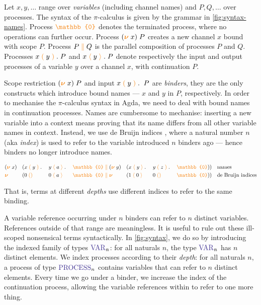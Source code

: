 \documentclass[a4paper,UKenglish,cleveref,autoref,thm-restate,authorcolumns]{lipics-v2019}
\theoremstyle{definition}
\newcommand{\picalc}{$\pi$-calculus}
\newcommand{\type}[1]{\textcolor{BlueViolet}{\operatorname{#1}}}
\newcommand{\constr}[1]{\textcolor{BurntOrange}{\operatorname{#1}}}
\newcommand{\PO}{\constr{\mathbb{0}}}
\newcommand{\comp}[2]{#1 \; \constr{\parallel} \; #2}
\newcommand{\new}{\constr{\boldsymbol{\nu}} \;}
\newcommand{\send}[2]{#1 \; \constr{\langle} \; #2 \;\constr{\rangle} \;}
\newcommand{\sendp}[2]{#1 \; \constr{\langle} \; #2 \; \constr{\rangle} \; . \;}
\newcommand{\recv}[1]{#1 \; \constr{\mathbb{()}} \;}
\newcommand{\recvp}[2]{#1 \; \constr{(} \; #2 \; \constr{)} \; . \; }
\newcommand{\Var}{\type{VAR}}
\newcommand{\Process}{\type{PROCESS}}
\begin{document}
Let $x, y,\ldots$ range over \emph{variables} (including channel names) and $P, Q,\ldots$ over processes.
The syntax of the \picalc{} \cite{Sangio01} is given by the grammar in \autoref{fig:syntax-names}.
Process $\PO$ denotes the terminated process, where no operations can further occur.
Process $(\new{}x)\; P$ creates a new channel $x$ bound with scope $P$.
Process $\comp{P}{Q}$ is the parallel composition of processes $P$ and $Q$.
Processes $\recvp{x}{y} P$ and $\sendp{x}{y} P$ denote respectively the input and output processes of a variable $y$ over a channel $x$, with continuation $P$.

Scope restriction $(\new{}x) \; P$ and input $\recvp{x}{y} \; P$ are \emph{binders}, they are the only constructs which introduce bound names --- $x$ and $y$ in $P$, respectively.
In order to mechanise the \picalc{} syntax in Agda, we need to deal with bound names in continuation processes.
Names are cumbersome to mechanise: inserting a new variable into a context means proving that its name differs from all other variable names in context.
Instead, we use de Bruijn indices \cite{deBruijn1972}, where a natural number $n$ (aka \emph{index}) is used to refer to the variable introduced $n$ binders ago --- hence binders no longer introduce names.
\begin{example}
  \begin{equation*}
    \begin{split}
      & (\new{}x ) && (\comp {\recvp{x}{y} && \sendp{y}{a} && \PO} {(\new{} y) && (\sendp{x}{y} && \recvp{y}{z} && \PO)})
      && \text{names}
      \\
      & \new{} && (\comp {\recv{0} && \send{0}{a} && \PO} {\new{} && (\send{1}{0} && \recv{0} && \PO)})
      && \text{de Bruijn indices}
      \\
    \end{split}
  \end{equation*}
\end{example}
That is, terms at different \emph{depths} use different indices to refer to the same binding.

A variable reference occurring under $n$ binders can refer to $n$ distinct variables.
References outside of that range are meaningless.
It is useful to rule out these ill-scoped nonsensical terms syntactically.
In \autoref{fig:syntax}, we do so by introducing the indexed family of types \cite{Dybjer1994} $\Var_n$: for all naturals $n$, the type $\Var_n$ has $n$ distinct elements.
We index processes according to their \emph{depth}: for all naturals $n$, a process of type $\Process_n$ contains variables that can refer to $n$ distinct elements.
Every time we go under a binder, we increase the index of the continuation process, allowing the variable references within to refer to one more thing.
\end{document}
